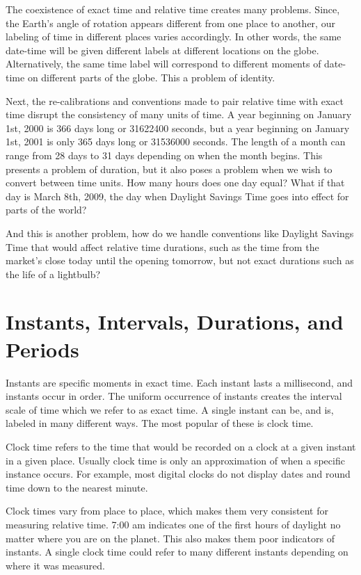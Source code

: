 \documentclass[article]{jss}
\begin{document}
The coexistence of exact time and relative time creates many problems. Since, the Earth's angle of rotation appears different from one place to another, our labeling of time in different places varies accordingly. In other words, the same date-time will be given different labels at different locations on the globe. Alternatively, the same time label will correspond to different moments of date-time on different parts of the globe.  This a problem of identity.

Next, the re-calibrations and conventions made to pair relative time with exact time disrupt the consistency of many units of time.  A year beginning on January 1st, 2000 is 366 days long or 31622400 seconds, but a year beginning on January 1st, 2001 is only 365 days long or 31536000 seconds.  The length of a month can range from 28 days to 31 days depending on when the month begins. This presents a problem of duration, but it also poses a problem when we wish to convert between time units. How many hours does one day equal? What if that day is March 8th, 2009, the day when Daylight Savings Time goes into effect for parts of the world?

And this is another problem, how do we handle conventions like Daylight Savings Time that would affect relative time durations, such as the time from the market's close today until the opening tomorrow, but not exact durations such as the life of a lightbulb?

\section{Instants, Intervals, Durations, and Periods}

Instants are specific moments in exact time. Each instant lasts a millisecond, and instants occur in order. The uniform occurrence of instants creates the interval scale of time which we refer to as exact time. A single instant can be, and is, labeled in many different ways.  The most popular of these is clock time.

Clock time refers to the time that would be recorded on a clock at a given instant in a given place. Usually clock time is only an approximation of when a specific instance occurs. For example, most digital clocks do not display dates and round time down to the nearest minute.

Clock times vary from place to place, which makes them very consistent for measuring relative time.  7:00 am indicates one of the first hours of daylight no matter where you are on the planet. This also makes them poor indicators of instants. A single clock time could refer to many different instants depending on where it was measured.
\end{document}
